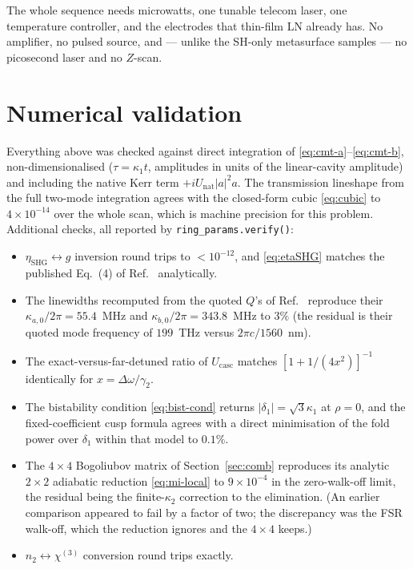 \documentclass[11pt,a4paper]{article}
\newcommand{\chithree}{\chi^{(3)}}
\newcommand{\Dom}{\Delta\omega}
\newcommand{\Ucasc}{U_{\text{casc}}}
\newcommand{\Unat}{U_{\text{nat}}}
\newcommand{\etanorm}{\eta_{\text{SHG}}}
\begin{document}
The whole sequence needs microwatts, one tunable telecom laser, one
temperature controller, and the electrodes that thin-film LN already
has.  No amplifier, no pulsed source, and --- unlike the SH-only
metasurface samples --- no picosecond laser and no $Z$-scan.

\section{Numerical validation}\label{sec:validation}

Everything above was checked against direct integration of
\eqref{eq:cmt-a}--\eqref{eq:cmt-b}, non-dimensionalised
($\tau=\kappa_1t$, amplitudes in units of the linear-cavity amplitude)
and including the native Kerr term $+i\Unat|a|^2a$.  The transmission
lineshape from the full two-mode integration agrees with the closed-form
cubic \eqref{eq:cubic} to $4\times10^{-14}$ over the whole scan, which
is machine precision for this problem.  Additional checks, all reported
by \verb|ring_params.verify()|:

\begin{itemize}[leftmargin=1.6em,itemsep=2pt]
\item $\etanorm\leftrightarrow g$ inversion round trips to $<10^{-12}$,
  and \eqref{eq:etaSHG} matches the published Eq.~(4) of
  Ref.~\cite{Lu2020} analytically.
\item The linewidths recomputed from the quoted $Q$'s of
  Ref.~\cite{Lu2020} reproduce their $\kappa_{a,0}/2\pi=55.4$~MHz and
  $\kappa_{b,0}/2\pi=343.8$~MHz to $3\%$ (the residual is their quoted
  mode frequency of $199$~THz versus $2\pi c/1560$~nm).
\item The exact-versus-far-detuned ratio of $\Ucasc$ matches
  $[1+1/(4x^2)]^{-1}$ identically for $x=\Dom/\gamma_2$.
\item The bistability condition \eqref{eq:bist-cond} returns
  $|\delta_1|=\sqrt3\kappa_1$ at $\rho=0$, and the fixed-coefficient cusp
  formula agrees with a direct minimisation of the fold power over
  $\delta_1$ within that model to $0.1\%$.
\item The $4\times4$ Bogoliubov matrix of Section~\ref{sec:comb}
  reproduces its analytic $2\times2$ adiabatic reduction
  \eqref{eq:mi-local} to $9\times10^{-4}$ in the zero-walk-off limit,
  the residual being the finite-$\kappa_2$ correction to the
  elimination.  (An earlier comparison appeared to fail by a factor of
  two; the discrepancy was the FSR walk-off, which the reduction
  ignores and the $4\times4$ keeps.)
\item $n_2\leftrightarrow\chithree$ conversion round trips exactly.
\end{itemize}
\end{document}

